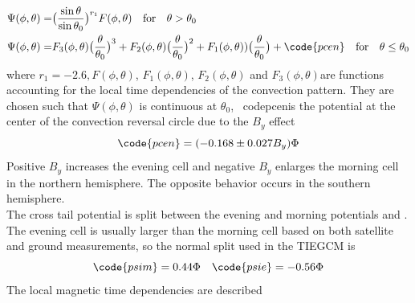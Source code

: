 \begin{enumerate}
\begin{enumerate}
% 
%
\begin{equation}
  \begin{split}
    \Psi(\phi,\theta) = & \bigl( \frac{\sin \theta}{\sin \theta_0} \bigr)^{r_1} F(\phi,\theta) 
             \quad   \text{for}\quad   \theta > \theta_0 \\
    \Psi(\phi,\theta) = & F_3(\phi,\theta)\bigl(\frac{\theta}{\theta_0}\bigr)^3 + 
        F_2(\phi,\theta)\bigl(\frac{\theta}{\theta_0}\bigr)^2 + 
	F_1(\phi,\theta))\bigl(\frac{\theta}{\theta_0}\bigr) + \code{pcen}
	\quad   \text{for} \quad  \theta \leq \theta_0
  \end{split}
    \label{eq:maginp_7}
\end{equation}
% 
where $r_1 = -2.6, F(\phi,\theta) $,  $F_1(\phi,\theta) $, $F_2(\phi,\theta)$  and  
 $F_3(\phi,\theta)$are functions accounting for the local time 
dependencies of the convection pattern. They are chosen such 
that $\Psi(\phi,\theta)$ is continuous at $\theta_0$,  \
code{pcen}is the potential at the center 
of the convection reversal circle due to the $B_y$ effect
%
\begin{equation}
  \code{pcen} = (-0.168 \pm 0.027 B_y)\Phi
    \label{eq:maginp_8}
\end{equation}
% 
Positive $B_y$ increases the evening cell and
negative $B_y$ enlarges the morning cell in the northern 
hemisphere. The opposite behavior occurs in the 
southern hemisphere. \\
%
The cross tail potential is split between the evening and 
morning potentials  and . The evening cell is usually 
larger than the morning cell based on both satellite and 
ground measurements, so the normal split used in the TIEGCM is
%
\begin{equation}
   \code{psim} = 0.44 \Phi \quad
   \code{psie} =-0.56 \Phi
    \label{eq:maginp_9}
\end{equation}
% 
The local magnetic time dependencies are described 

\end{enumerate}
\end{enumerate}
